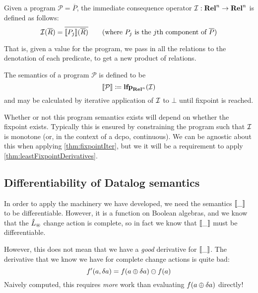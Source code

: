 \begin{defn}
  Given a program $\mathcal{P} = \overline{P}$, the immediate consequence operator $\mathcal{I}: \mathbf{Rel}^n \rightarrow \mathbf{Rel}^n$ is defined as follows:
  \begin{displaymath}
    \consq(\overline{R}) = \overline{\denote{P_j}(\overline{R})} \tag{where $P_j$ is the $j$th component of $\overline{P}$}
  \end{displaymath}
\end{defn}

That is, given a value for the program, we pass in all the relations
to the denotation of each predicate, to get a new product of relations.

\begin{defn}
  The semantics of a program $\mathcal{P}$ is defined to be
  \begin{displaymath}
    \llbracket \mathcal{P} \rrbracket \coloneqq \textbf{lfp}_{\mathbf{Rel}^n}(\mathcal{I})
  \end{displaymath}
  and may be calculated by iterative application of $\mathcal{I}$ to $\bot$ until
  fixpoint is reached.
\end{defn}

Whether or not this program semantics exists will depend on whether the fixpoint
exists. Typically this is ensured by constraining the program such that $\mathcal{I}$
is monotone (or, in the context of a dcpo, continuous). We can be agnostic
about this when applying \cref{thm:fixpointIter}, but we it will be a requirement to
apply \cref{thm:leastFixpointDerivatives}.

\subsection{Differentiability of Datalog semantics}
\label{sec:datalogDifferentiability}

In order to apply the machinery we have developed, we need the semantics $\llbracket \_ \rrbracket$ to
be differentiable. However, it is a function on Boolean algebras, and we know
that the $\hat{L}_\circledast$ change action is complete, so in fact we know that
$\llbracket \_ \rrbracket$ must be differentiable.

However, this does not mean that we have a \emph{good} derivative for
$\llbracket \_ \rrbracket$. The derivative that we know we have for complete change actions
is quite bad:
\begin{displaymath}
  f'(a, \delta a) = f(a \oplus \delta a) \ominus f(a)
\end{displaymath}
Naively computed, this requires \emph{more} work than evaluating $f(a \oplus \delta a)$ directly!

